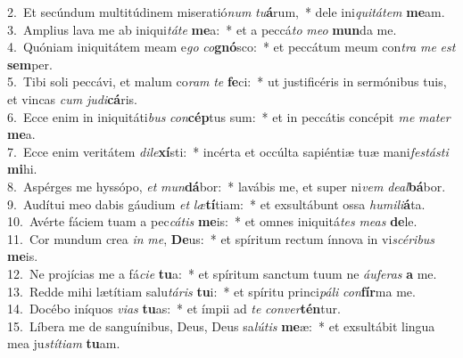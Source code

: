 {2.~}Et secúndum multitúdinem miseratió\textit{num} \textit{tu}\textbf{á}rum,~* dele ini\textit{qui}\textit{tá}\textit{tem} \textbf{me}am.\\
{3.~}Amplius lava me ab iniqui\textit{tá}\textit{te} \textbf{me}a:~* et a peccá\textit{to} \textit{me}\textit{o} \textbf{mun}da me.\\
{4.~}Quóniam iniquitátem meam e\textit{go} \textit{co}\textbf{gnó}sco:~* et peccátum meum con\textit{tra} \textit{me} \textit{est} \textbf{sem}per.\\
{5.~}Tibi soli peccávi, et malum co\textit{ram} \textit{te} \textbf{fe}ci:~* ut justificéris in sermónibus tuis, et vincas \textit{cum} \textit{ju}\textit{di}\textbf{cá}ris.\\
{6.~}Ecce enim in iniquitáti\textit{bus} \textit{con}\textbf{cép}tus sum:~* et in peccátis concépit \textit{me} \textit{ma}\textit{ter} \textbf{me}a.\\
{7.~}Ecce enim veritátem \textit{di}\textit{le}\textbf{xí}sti:~* incérta et occúlta sapiéntiæ tuæ mani\textit{fe}\textit{stá}\textit{sti} \textbf{mi}hi.\\
{8.~}Aspérges me hyssópo, \textit{et} \textit{mun}\textbf{dá}bor:~* lavábis me, et super ni\textit{vem} \textit{de}\textit{al}\textbf{bá}bor.\\
{9.~}Audítui meo dabis gáudium \textit{et} \textit{læ}\textbf{tí}tiam:~* et exsultábunt ossa \textit{hu}\textit{mi}\textit{li}\textbf{á}ta.\\
{10.~}Avérte fáciem tuam a pec\textit{cá}\textit{tis} \textbf{me}is:~* et omnes iniquitá\textit{tes} \textit{me}\textit{as} \textbf{de}le.\\
{11.~}Cor mundum crea \textit{in} \textit{me}, \textbf{De}us:~* et spíritum rectum ínnova in vi\textit{scé}\textit{ri}\textit{bus} \textbf{me}is.\\
{12.~}Ne projícias me a fá\textit{ci}\textit{e} \textbf{tu}a:~* et spíritum sanctum tuum ne \textit{áu}\textit{fe}\textit{ras} \textbf{a} me.\\
{13.~}Redde mihi lætítiam salu\textit{tá}\textit{ris} \textbf{tu}i:~* et spíritu princi\textit{pá}\textit{li} \textit{con}\textbf{fír}ma me.\\
{14.~}Docébo iníquos \textit{vi}\textit{as} \textbf{tu}as:~* et ímpii ad \textit{te} \textit{con}\textit{ver}\textbf{tén}tur.\\
{15.~}Líbera me de sanguínibus, Deus, Deus sa\textit{lú}\textit{tis} \textbf{me}æ:~* et exsultábit lingua mea ju\textit{stí}\textit{ti}\textit{am} \textbf{tu}am.\\
